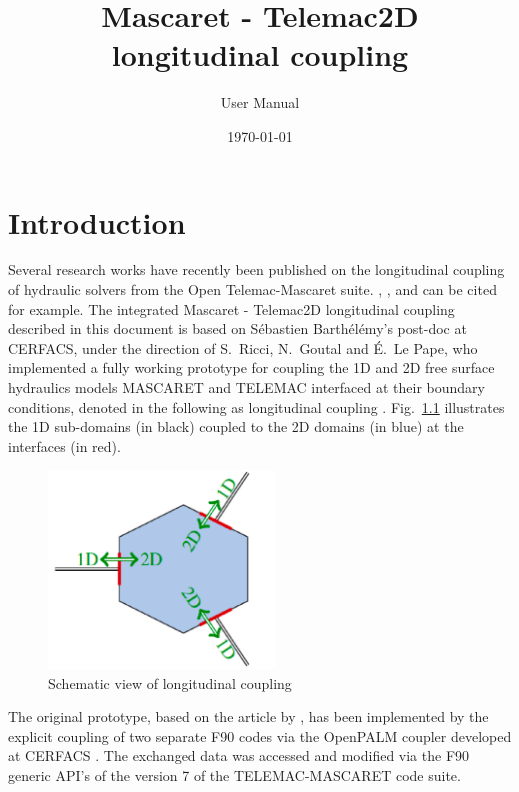 \documentclass[Coupling]{../../data/TelemacDoc} %
\begin{document}
\let\cleardoublepage\clearpage

\title{Mascaret - Telemac2D\\longitudinal coupling}
\subtitle{User Manual}
\version{\telmaversion}
\date{\today}
\maketitle
\clearpage

\newpage
\thispagestyle{empty}
\TelemacCopyright{}

\pagestyle{empty}
\tableofcontents

\pagestyle{fancy}

\chapter{Introduction}
Several research works have recently been published on the
longitudinal coupling of hydraulic solvers from the Open
Telemac-Mascaret suite. \cite{Tayachi2013}, \cite{Tayachi2014}, and
\cite{PhDDaou} can be cited for example. 
The integrated Mascaret - Telemac2D longitudinal coupling described in
this document is based on S\'ebastien Barth\'el\'emy's post-doc at
CERFACS, under the 
direction of S.~Ricci, N.~Goutal and \'E.~Le Pape, who implemented a
fully working prototype for coupling the 1D and 2D free surface
hydraulics models MASCARET and TELEMAC interfaced at their boundary
conditions, denoted in the following as longitudinal coupling
\cite{Barthelemy2018, BarthelemyPhD,
  Ricci2018EoCoE}. Fig.~\ref{fig:Schema_1D-2D_interface} illustrates
the 1D sub-domains (in black) coupled to the 2D domains (in blue) at
the interfaces (in red). 
\begin{figure}[htbp]
    \centering
        \centering \includegraphics[width=6cm]{figures/Schema_1D-2D_interface.png}
    \caption{Schematic view of longitudinal coupling}\label{fig:Schema_1D-2D_interface}
\end{figure}

The original prototype, based on the article by \cite{Malleron2011},
has been implemented by the explicit coupling 
of two separate F90 codes via the OpenPALM coupler developed at
CERFACS \cite{piacentini2011palm}. The exchanged data was accessed and
modified via the F90 
generic API's of the version 7 of the TELEMAC-MASCARET code suite.
\end{document}
